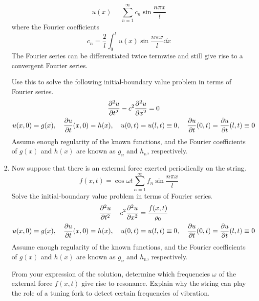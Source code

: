\documentclass[../psets.tex]{subfiles}
\begin{document}
\begin{enumerate}
\begin{equation*}
        u(x) = \sum_{n=1}^\infty c_n\sin\frac{n\pi x}{l}
    \end{equation*}
    where the Fourier coefficients
    \begin{equation*}
        c_n = \frac{2}{l}\int_0^lu(x)\sin\frac{n\pi x}{l}\dd{x}
    \end{equation*}
    The Fourier series can be differentiated twice termwise and still give rise to a convergent Fourier series.
    \endgroup\par
    Use this to solve the following initial-boundary value problem in terms of Fourier series.
    \begin{gather*}
        \pdv[2]{u}{t}-c^2\pdv[2]{u}{x} = 0\\
        u(x,0) = g(x)
            ,\quad
            {\pdv{u}{t}}(x,0) = h(x)
            ,\quad
            u(0,t) = u(l,t) \equiv 0
            ,\quad
            {\pdv{u}{t}}(0,t) = {\pdv{u}{t}}(l,t) \equiv 0
    \end{gather*}
    Assume enough regularity of the known functions, and the Fourier coefficients of $g(x)$ and $h(x)$ are known as $g_n$ and $h_n$, respectively.
    \item Now suppose that there is an external force exerted periodically on the string.
    \begin{equation*}
        f(x,t) = \cos\omega t\sum_{n=1}^\infty f_n\sin\frac{n\pi x}{l}
    \end{equation*}
    Solve the initial-boundary value problem in terms of Fourier series.
    \begin{gather*}
        \pdv[2]{u}{t}-c^2\pdv[2]{u}{x} = \frac{f(x,t)}{\rho_0}\\
        u(x,0) = g(x)
            ,\quad
            {\pdv{u}{t}}(x,0) = h(x)
            ,\quad
            u(0,t) = u(l,t) \equiv 0
            ,\quad
            {\pdv{u}{t}}(0,t) = {\pdv{u}{t}}(l,t) \equiv 0
    \end{gather*}
    Assume enough regularity of the known functions, and the Fourier coefficients of $g(x)$ and $h(x)$ are known as $g_n$ and $h_n$, respectively.\par
    From your expression of the solution, determine which frequencies $\omega$ of the external force $f(x,t)$ give rise to resonance. Explain why the string can play the role of a tuning fork to detect certain frequencies of vibration.
\end{enumerate}
\end{document}
